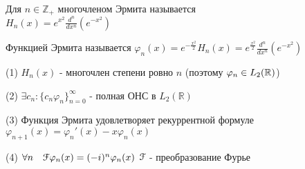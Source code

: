 \documentclass[a4paper,12pt]{report}
\newcommand*{\hm}[1]{#1\nobreak\discretionary{}%
            {\hbox{$\mathsurround=0pt #1$}}{}}
\begin{document}
\begin{df}
Для $n\in\mathbb Z_+$ многочленом Эрмита называется\\ $H_n(x)=e^{x^2}\displaystyle\frac{d^n}{dx^n}(e^{-x^2})$

Функцией Эрмита называется $\varphi_n(x)=e^{-\frac{x^2}{2}}H_n(x)=e^{\frac{x^2}{2}}\displaystyle\frac{d^n}{dx^n}(e^{-x^2})$
\end{df}


\begin{thm}
(1) $H_n(x)$ - многочлен степени ровно $n$ (поэтому {$\varphi_n\hm\in L_2(\mathbb R)$})

(2) $\exists c_n\colon\{c_n\varphi_n\}_{n=0}^\infty$ - полная ОНС в $L_2(\mathbb R)$

(3) Функция Эрмита удовлетворяет рекуррентной формуле \\ $\varphi_{n+1}(x)=\varphi_n'(x)-x\varphi_n(x)$

(4) $\forall n\quad\EuScript F\varphi_n(x)=(-i)^n\varphi_n(x)$ $\EuScript F$ - преобразование Фурье
\end{thm}
\end{document}
